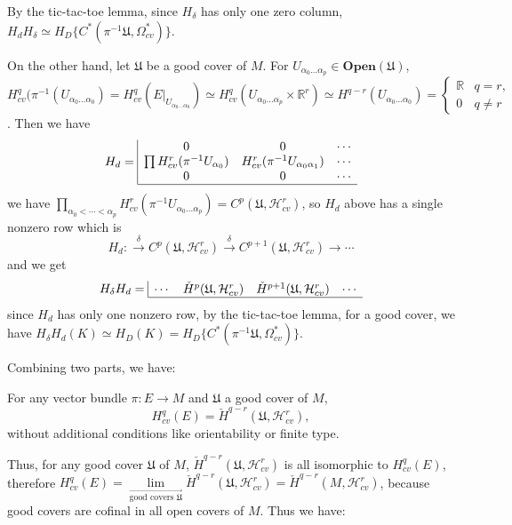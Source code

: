 \documentclass{article}
\theoremstyle{mystyle}
\theoremstyle{remark}
\numberwithin{equation}{section}
\begin{document}
By the tic-tac-toe lemma, since $H_\delta$ has only one zero column, $H_dH_\delta \simeq H_D\{C^*(\pi^{-1}\mathfrak{U},\Omega^*_{cv})\}$. 

On the other hand, let $\mathfrak{U}$ be a good cover of $M$. For $U_{\alpha_0...\alpha_p} \in \mathbf{Open}(\mathfrak{U})$, 
$H^q_{cv}(\pi^{-1}(U_{\alpha_0...\alpha_0})
=
H^q_{cv}(E|_{U_{\alpha_0...\alpha_0}})
\simeq H^q_{cv}(U_{\alpha_0...\alpha_p}\times \mathbb{R}^r) \simeq H^{q-r}(U_{\alpha_0...\alpha_0}) = \left\{\begin{array}{ll}\mathbb{R}& q=r,\\
0 & q\neq r\end{array}\right.$. Then we have
$$
H_d = 
\begin{array}{|ccc}0&0&\cdots \\
\prod H^r_{cv}(\pi^{-1}U_{\alpha_0}) &  H^r_{cv}(\pi^{-1}U_{\alpha_0\alpha_1}) & \cdots\\
0&0&\cdots\\\hline
\end{array}
$$
we have $\prod_{\alpha_0<\cdots <\alpha_p} H^r_{cv}(\pi^{-1}U_{\alpha_0...\alpha_p})=C^p(\mathfrak{U},\mathcal{H}^r_{cv})$, 
so $H_d$ above has a single nonzero row which is
$$H_d \colon \xrightarrow{\delta} C^p(\mathfrak{U},\mathcal{H}^r_{cv})\xrightarrow{\delta} C^{p+1}(\mathfrak{U},\mathcal{H}^r_{cv})\rightarrow \cdots$$
and we get
$$H_\delta H_d = \begin{array}{|cccc} \cdots & \check{H}^p(\mathfrak{U},\mathcal{H}^r_{cv})& \check{H}^{p+1}(\mathfrak{U},\mathcal{H}^r_{cv}) & \cdots\\\hline\end{array}$$
since $H_d$ has only one nonzero row, by the tic-tac-toe lemma, for a good cover, we have $H_\delta H_d(K) \simeq H_D(K)
=H_D\{C^*(\pi^{-1}\mathfrak{U},\Omega^*_{cv})\}$. 

Combining two parts, we have:

For any vector bundle $\pi\colon E\rightarrow M$ and $\mathfrak{U}$ a good cover of $M$, 
$$H^q_{cv}(E)  = \check{H}^{q-r}(\mathfrak{U},\mathcal{H}^r_{cv}),$$
without additional conditions like orientability or finite type.

Thus, for any good cover $\mathfrak{U}$ of $M$, $\check{H}^{q-r}(\mathfrak{U},\mathcal{H}^r_{cv})$ is all isomorphic to $H^q_{cv}(E)$, therefore 
$H^q_{cv}(E) = \lim\limits_{\stackrel{\longrightarrow}{\text{good covers }\mathfrak{U}}} \check{H}^{q-r}(\mathfrak{U},\mathcal{H}^r_{cv}) = \check{H}^{q-r}(M,\mathcal{H}^r_{cv})$, because good covers are cofinal in all open covers of $M$. Thus we have:
\end{document}
